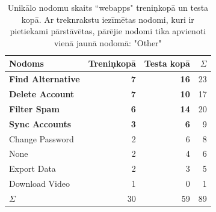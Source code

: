\begin{table}[htbp]
  \centering
  \caption{Unikālo nodomu skaits ``webapps" treniņkopā un testa kopā. Ar treknrakstu iezīmētas nodomi, kuri ir pietiekami pārstāvētas, pārējie nodomi tika apvienoti vienā jaunā nodomā: "Other"}
    \begin{tabular}{lrrr} \toprule
    Nodoms & Treniņkopā & Testa kopā & $\Sigma$ \\\midrule
    \textbf{Find Alternative} & \textbf{7} & \textbf{16} & 23\\
    \textbf{Delete Account} & \textbf{7} & \textbf{10} & 17\\
    \textbf{Filter Spam} & \textbf{6} & \textbf{14} & 20 \\
    \textbf{Sync Accounts} & \textbf{3} & \textbf{6} & 9 \\
    Change Password & 2     & 6 & 8\\
    None  & 2     & 4 & 6\\
    Export Data & 2     & 3 & 5 \\
    Download Video & 1     & 0 & 1\\
    $\Sigma$ & 30    & 59 & 89 \\\bottomrule
    \end{tabular}%
  \label{tab:webapps-labels}%
\end{table}%


